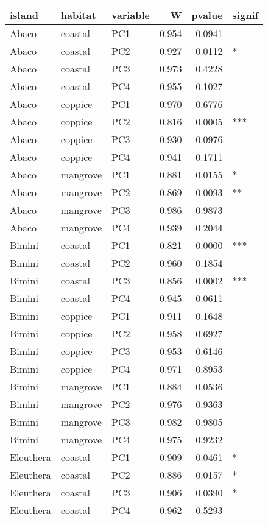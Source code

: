 
\begin{tabular}{lllrrl}
\toprule
island & habitat & variable & W & pvalue & signif\\
\midrule
Abaco & coastal & PC1 & 0.954 & 0.0941 & \\
Abaco & coastal & PC2 & 0.927 & 0.0112 & *\\
Abaco & coastal & PC3 & 0.973 & 0.4228 & \\
Abaco & coastal & PC4 & 0.955 & 0.1027 & \\
Abaco & coppice & PC1 & 0.970 & 0.6776 & \\
\addlinespace
Abaco & coppice & PC2 & 0.816 & 0.0005 & ***\\
Abaco & coppice & PC3 & 0.930 & 0.0976 & \\
Abaco & coppice & PC4 & 0.941 & 0.1711 & \\
Abaco & mangrove & PC1 & 0.881 & 0.0155 & *\\
Abaco & mangrove & PC2 & 0.869 & 0.0093 & **\\
\addlinespace
Abaco & mangrove & PC3 & 0.986 & 0.9873 & \\
Abaco & mangrove & PC4 & 0.939 & 0.2044 & \\
Bimini & coastal & PC1 & 0.821 & 0.0000 & ***\\
Bimini & coastal & PC2 & 0.960 & 0.1854 & \\
Bimini & coastal & PC3 & 0.856 & 0.0002 & ***\\
\addlinespace
Bimini & coastal & PC4 & 0.945 & 0.0611 & \\
Bimini & coppice & PC1 & 0.911 & 0.1648 & \\
Bimini & coppice & PC2 & 0.958 & 0.6927 & \\
Bimini & coppice & PC3 & 0.953 & 0.6146 & \\
Bimini & coppice & PC4 & 0.971 & 0.8953 & \\
\addlinespace
Bimini & mangrove & PC1 & 0.884 & 0.0536 & \\
Bimini & mangrove & PC2 & 0.976 & 0.9363 & \\
Bimini & mangrove & PC3 & 0.982 & 0.9805 & \\
Bimini & mangrove & PC4 & 0.975 & 0.9232 & \\
Eleuthera & coastal & PC1 & 0.909 & 0.0461 & *\\
\addlinespace
Eleuthera & coastal & PC2 & 0.886 & 0.0157 & *\\
Eleuthera & coastal & PC3 & 0.906 & 0.0390 & *\\
Eleuthera & coastal & PC4 & 0.962 & 0.5293 & \\

\end{tabular}
